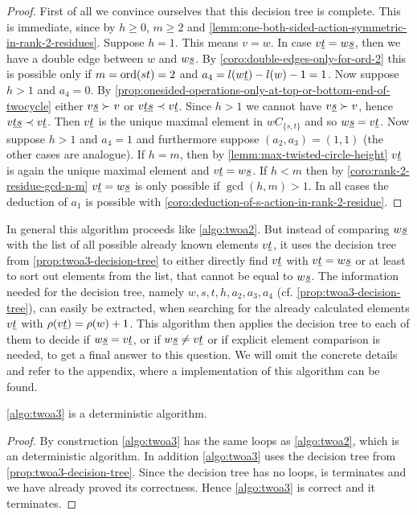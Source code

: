 \begin{prop}
	\begin{proof}
		First of all we convince ourselves that this decision tree is complete. This is immediate, since by $h \geq 0$, $m \geq 2$ and \ref{lemm:one-both-sided-action-symmetric-in-rank-2-residues}. Suppose $h=1$. This means $v = w$. In case $v \underline{t} = w \underline{s}$, then we have a double edge between $w$ and $w \underline{s}$. By \ref{coro:double-edges-only-for-ord-2} this is possible only if $m = \operatorname{ord}(st) = 2$ and $a_4 = l(w \underline{t}) - l(w) - 1 = 1$. Now suppose $h > 1$ and $a_4=0$. By \ref{prop:onesided-operations-only-at-top-or-bottom-end-of-twocycle} either $v \underline{s} \succ v$ or $v \underline{t} \underline{s} \prec v \underline{t}$. Since $h > 1$ we cannot have $v \underline{s} \succ v$, hence $v \underline{t} \underline{s} \prec v \underline{t}$. Then $v \underline{t}$ is the unique maximal element in $wC_{\{s,t\}}$ and so $w \underline{s} = v \underline{t}$. Now suppose $h > 1$ and $a_4=1$ and furthermore suppose $(a_2,a_3)=(1,1)$ (the other cases are analogue). If $h = m$, then by \ref{lemm:max-twisted-circle-height} $v \underline{t}$ is again the unique maximal element and $v \underline{t} = w \underline{s}$. If $h < m$ then by \ref{coro:rank-2-residue-gcd-n-m} $v \underline{t} = w \underline{s}$ is only possible if $\gcd(h,m) > 1$. In all cases the deduction of $a_1$ is possible with \ref{coro:deduction-of-s-action-in-rank-2-residue}.
	\end{proof}
\end{prop}

\begin{algo}[TWOA3]
	In general this algorithm proceeds like \ref{algo:twoa2}. But instead of comparing $w \underline{s}$ with the list of all possible already known elements $v \underline{t}$, it uses the decision tree from \ref{prop:twoa3-decision-tree} to either directly find $v \underline{t}$ with $v \underline{t} = w \underline{s}$ or at least to sort out elements from the list, that cannot be equal to $w \underline{s}$. The information needed for the decision tree, namely $w, s, t, h, a_2, a_3, a_4$ (cf. \ref{prop:twoa3-decision-tree}), can easily be extracted, when searching for the already calculated elements $v \underline{t}$ with $\rho(v \underline{t}) = \rho(w) + 1$. This algorithm then applies the decision tree to each of them to decide if $w \underline{s} = v \underline{t}$, or if $w \underline{s} \neq v \underline{t}$ or if explicit element comparison is needed, to get a final answer to this question. We will omit the concrete details and refer to the appendix, where a implementation of this algorithm can be found.
\end{algo}

\begin{lemm}
	\ref{algo:twoa3} is a deterministic algorithm.

	\begin{proof}
		By construction \ref{algo:twoa3} has the same loops as \ref{algo:twoa2}, which is an deterministic algorithm. In addition \ref{algo:twoa3} uses the decision tree from \ref{prop:twoa3-decision-tree}. Since the decision tree has no loops, is terminates and we have already proved its correctness. Hence \ref{algo:twoa3} is correct and it terminates.
	\end{proof}
\end{lemm}

